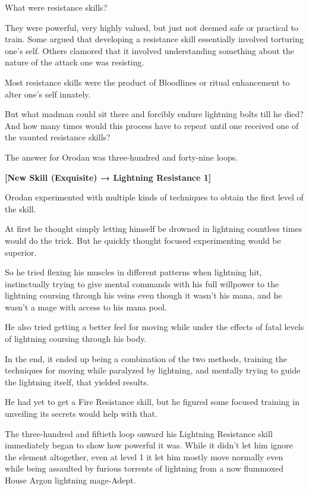 \documentclass[a4paper,10pt]{book}
\begin{document}
What were resistance skills?\par
They were powerful, very highly valued, but just not deemed safe or practical to train. Some argued that developing a resistance skill essentially involved torturing one’s self. Others clamored that it involved understanding something about the nature of the attack one was resisting.\par
Most resistance skills were the product of Bloodlines or ritual enhancement to alter one’s self innately.\par
But what madman could sit there and forcibly endure lightning bolts till he died? And how many times would this process have to repeat until one received one of the vaunted resistance skills?\par
The answer for Orodan was three-hundred and forty-nine loops.\par
\textbf{[New Skill (Exquisite) → Lightning Resistance 1]}\par
Orodan experimented with multiple kinds of techniques to obtain the first level of the skill.\par
At first he thought simply letting himself be drowned in lightning countless times would do the trick. But he quickly thought focused experimenting would be superior.\par
So he tried flexing his muscles in different patterns when lightning hit, instinctually trying to give mental commands with his full willpower to the lightning coursing through his veins even though it wasn’t his mana, and he wasn’t a mage with access to his mana pool.\par
He also tried getting a better feel for moving while under the effects of fatal levels of lightning coursing through his body.\par
In the end, it ended up being a combination of the two methods, training the techniques for moving while paralyzed by lightning, and mentally trying to guide the lightning itself, that yielded results.\par
He had yet to get a Fire Resistance skill, but he figured some focused training in unveiling its secrets would help with that.\par
\par
The three-hundred and fiftieth loop onward his Lightning Resistance skill immediately began to show how powerful it was. While it didn’t let him ignore the element altogether, even at level 1 it let him mostly move normally even while being assaulted by furious torrents of lightning from a now flummoxed House Argon lightning mage-Adept.\par
\end{document}

